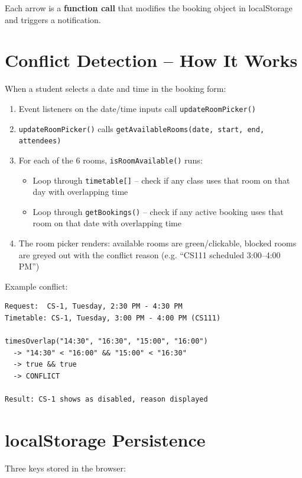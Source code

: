 \documentclass[12pt,a4paper]{article}
\begin{document}
Each arrow is a \textbf{function call} that modifies the booking object in localStorage and triggers a notification.

\section{Conflict Detection -- How It Works}

When a student selects a date and time in the booking form:

\begin{enumerate}
  \item Event listeners on the date/time inputs call \texttt{updateRoomPicker()}
  \item \texttt{updateRoomPicker()} calls \texttt{getAvailableRooms(date, start, end, attendees)}
  \item For each of the 6 rooms, \texttt{isRoomAvailable()} runs:
    \begin{itemize}
      \item Loop through \texttt{timetable[]} -- check if any class uses that room on that day with overlapping time
      \item Loop through \texttt{getBookings()} -- check if any active booking uses that room on that date with overlapping time
    \end{itemize}
  \item The room picker renders: available rooms are green/clickable, blocked rooms are greyed out with the conflict reason (e.g. ``CS111 scheduled 3:00--4:00 PM'')
\end{enumerate}

Example conflict:
\begin{lstlisting}
Request:  CS-1, Tuesday, 2:30 PM - 4:30 PM
Timetable: CS-1, Tuesday, 3:00 PM - 4:00 PM (CS111)

timesOverlap("14:30", "16:30", "15:00", "16:00")
  -> "14:30" < "16:00" && "15:00" < "16:30"
  -> true && true
  -> CONFLICT

Result: CS-1 shows as disabled, reason displayed
\end{lstlisting}

\section{localStorage Persistence}

Three keys stored in the browser:
\end{document}

